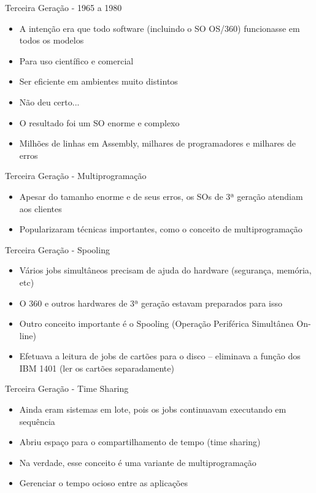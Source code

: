 \documentclass{beamer}
\begin{document}
  \begin{frame}{Terceira Geração - 1965 a 1980}
      \begin{itemize}
          \item A intenção era que todo software (incluindo o SO OS/360) funcionasse em todos os modelos
          \item Para uso científico e comercial
          \item Ser eficiente em ambientes muito distintos
          \item Não deu certo...
          \item O resultado foi um SO enorme e complexo
          \item Milhões de linhas em Assembly, milhares de programadores e milhares de erros
      \end{itemize}
  \end{frame}
  \begin{frame}{Terceira Geração - Multiprogramação}
      \begin{itemize}
          \item Apesar do tamanho enorme e de seus erros, os SOs de 3ª geração atendiam aos clientes
          \item Popularizaram técnicas importantes, como o conceito de multiprogramação
      \end{itemize}
  \end{frame}
  \begin{frame}{Terceira Geração - Spooling}
      \begin{itemize}
          \item Vários jobs simultâneos precisam de ajuda do hardware (segurança, memória, etc)
          \item O 360 e outros hardwares de 3ª geração estavam preparados para isso
          \item Outro conceito importante é o Spooling (Operação Periférica Simultânea On-line)
          \item Efetuava a leitura de jobs de cartões para o disco – eliminava a função dos IBM 1401 (ler os cartões separadamente)
      \end{itemize}
  \end{frame}
  \begin{frame}{Terceira Geração - Time Sharing}
      \begin{itemize}
          \item Ainda eram sistemas em lote, pois os jobs continuavam executando em sequência
          \item Abriu espaço para o compartilhamento de tempo (time sharing)
          \item Na verdade, esse conceito é uma variante de multiprogramação
          \item Gerenciar o tempo ocioso entre as aplicações
      \end{itemize}
  \end{frame}
\end{document}
